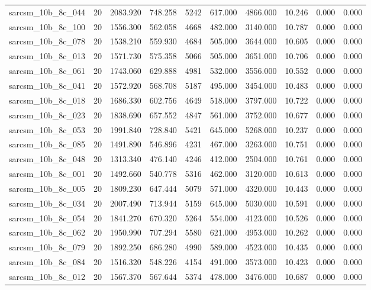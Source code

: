 \begin{tabular}{lrrrrrrrrr}
sarcsm\_10b\_8c\_044 & 20 & 2083.920 & 748.258 & 5242 & 617.000 & 4866.000 & 10.246 & 0.000 & 0.000 \\
sarcsm\_10b\_8c\_100 & 20 & 1556.300 & 562.058 & 4668 & 482.000 & 3140.000 & 10.787 & 0.000 & 0.000 \\
sarcsm\_10b\_8c\_078 & 20 & 1538.210 & 559.930 & 4684 & 505.000 & 3644.000 & 10.605 & 0.000 & 0.000 \\
sarcsm\_10b\_8c\_013 & 20 & 1571.730 & 575.358 & 5066 & 505.000 & 3651.000 & 10.706 & 0.000 & 0.000 \\
sarcsm\_10b\_8c\_061 & 20 & 1743.060 & 629.888 & 4981 & 532.000 & 3556.000 & 10.552 & 0.000 & 0.000 \\
sarcsm\_10b\_8c\_041 & 20 & 1572.920 & 568.708 & 5187 & 495.000 & 3454.000 & 10.483 & 0.000 & 0.000 \\
sarcsm\_10b\_8c\_018 & 20 & 1686.330 & 602.756 & 4649 & 518.000 & 3797.000 & 10.722 & 0.000 & 0.000 \\
sarcsm\_10b\_8c\_023 & 20 & 1838.690 & 657.552 & 4847 & 561.000 & 3752.000 & 10.677 & 0.000 & 0.000 \\
sarcsm\_10b\_8c\_053 & 20 & 1991.840 & 728.840 & 5421 & 645.000 & 5268.000 & 10.237 & 0.000 & 0.000 \\
sarcsm\_10b\_8c\_085 & 20 & 1491.890 & 546.896 & 4231 & 467.000 & 3263.000 & 10.751 & 0.000 & 0.000 \\
sarcsm\_10b\_8c\_048 & 20 & 1313.340 & 476.140 & 4246 & 412.000 & 2504.000 & 10.761 & 0.000 & 0.000 \\
sarcsm\_10b\_8c\_001 & 20 & 1492.660 & 540.778 & 5316 & 462.000 & 3120.000 & 10.613 & 0.000 & 0.000 \\
sarcsm\_10b\_8c\_005 & 20 & 1809.230 & 647.444 & 5079 & 571.000 & 4320.000 & 10.443 & 0.000 & 0.000 \\
sarcsm\_10b\_8c\_034 & 20 & 2007.490 & 713.944 & 5159 & 645.000 & 5030.000 & 10.591 & 0.000 & 0.000 \\
sarcsm\_10b\_8c\_054 & 20 & 1841.270 & 670.320 & 5264 & 554.000 & 4123.000 & 10.526 & 0.000 & 0.000 \\
sarcsm\_10b\_8c\_062 & 20 & 1950.990 & 707.294 & 5580 & 621.000 & 4953.000 & 10.262 & 0.000 & 0.000 \\
sarcsm\_10b\_8c\_079 & 20 & 1892.250 & 686.280 & 4990 & 589.000 & 4523.000 & 10.435 & 0.000 & 0.000 \\
sarcsm\_10b\_8c\_084 & 20 & 1516.320 & 548.226 & 4154 & 491.000 & 3573.000 & 10.423 & 0.000 & 0.000 \\
sarcsm\_10b\_8c\_012 & 20 & 1567.370 & 567.644 & 5374 & 478.000 & 3476.000 & 10.687 & 0.000 & 0.000 \\

\end{tabular}
